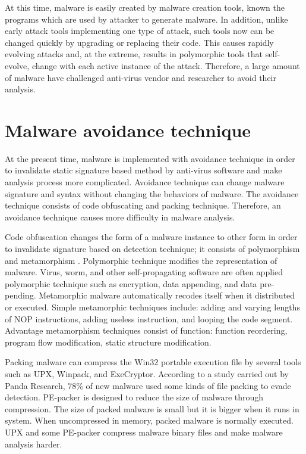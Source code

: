 At this time, malware is easily created by malware creation tools, known the programs which are used by attacker to generate malware\cite{Microsoft}. In addition, unlike early attack tools implementing one type of attack, such tools now can be changed quickly by upgrading or replacing their code. This causes rapidly evolving attacks and, at the extreme, results in polymorphic tools that self-evolve, change with each active instance of the attack. Therefore, a large amount of malware have challenged anti-virus vendor and researcher to avoid their analysis.

\section{Malware avoidance technique}

At the present time, malware is implemented with avoidance technique in order to invalidate static signature based method by anti-virus software and make analysis process more complicated. Avoidance technique can change malware signature and syntax without changing the behaviors of malware. The avoidance technique consists of code obfuscating and packing technique. Therefore, an avoidance technique causes more difficulty in malware analysis. 
 
Code obfuscation changes the form of a malware instance to other form in order to invalidate signature based on detection technique; it consists of polymorphism and metamorphism \cite{blackhat1}. Polymorphic technique modifies the representation of malware. Virus, worm, and other self-propagating software are often applied polymorphic technique such as encryption, data appending, and data pre-pending.  Metamorphic malware automatically recodes itself when it distributed or executed\cite{blackhat1}. Simple metamorphic techniques include: adding and varying lengths of NOP instructions, adding useless instruction, and looping the code segment. Advantage metamorphism techniques consist of function: function reordering, program flow modification, static structure modification.

Packing malware can compress the Win32 portable execution file by several tools such as UPX, Winpack, and ExeCryptor. According to a study carried out by Panda Research, $78$\% of new malware used some kinds of file packing to evade detection. PE-packer is designed to reduce the size of malware through compression. The size of packed malware is small but it is bigger when it runs in system\cite{packing}. When uncompressed in memory, packed malware is normally executed. UPX and some PE-packer compress malware binary files and make malware analysis harder.

